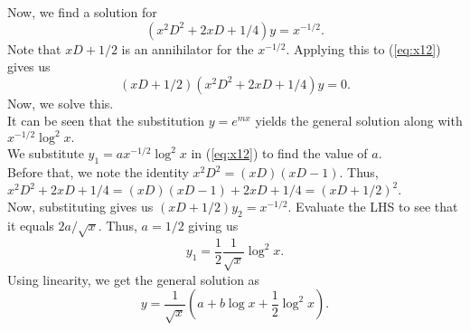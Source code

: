 \documentclass[12pt]{article}
\theoremstyle{definition}
\numberwithin{thm}{section}
\begin{document}
\begin{enumerate}[leftmargin=*, label = Q.\arabic*.]
\begin{enumerate}[start = 3, label = (\roman*)]
		Now, we find a solution for
		\begin{equation} \label{eq:x12}
			(x^2D^2 + 2xD + 1/4)y = x^{-1/2}.
		\end{equation}
		Note that $xD+1/2$ is an annihilator for the $x^{-1/2}.$ Applying this to (\ref{eq:x12}) gives us
		\begin{equation*} 
			(xD + 1/2)(x^2D^2 + 2xD + 1/4)y = 0.
		\end{equation*}
		Now, we solve this. \\
		It can be seen that the substitution $y = e^{mx}$ yields the general solution along with $x^{-1/2}\log^2 x.$\\
		We substitute $y_1 = ax^{-1/2}\log^2 x$ in (\ref{eq:x12}) to find the value of $a.$\\
		Before that, we note the identity $x^2D^2 = (xD)(xD - 1).$ Thus, $x^2D^2 + 2xD + 1/4 = (xD)(xD - 1) + 2xD + 1/4 = (xD + 1/2)^2.$\\
		Now, substituting gives us $(xD + 1/2)y_2 = x^{-1/2}.$ Evaluate the LHS to see that it equals $2a/\sqrt{x}.$ Thus, $a = 1/2$ giving us 
		\begin{equation}
			y_1 = \dfrac{1}{2}\frac{1}{\sqrt{x}}\log^2x.
		\end{equation}
		Using linearity, we get the general solution as
		\[y = \frac{1}{\sqrt{x}}\left(a + b\log x + \frac{1}{2}\log^2x\right).\]


\end{enumerate}
\end{enumerate}
\end{document}
